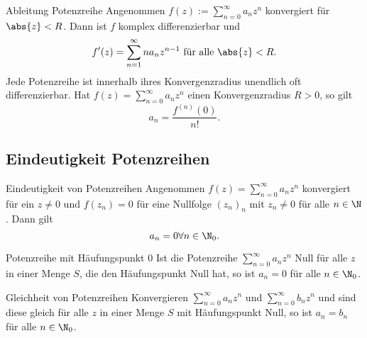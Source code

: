 \begin{karte}{Ableitung Potenzreihe}
    Angenommen \(f(z) := \sum_{n=0}^\infty a_n z^n\) konvergiert für \(\abs{z} < R\). 
    Dann ist \(f\) komplex differenzierbar und 
    \[ f'(z) = \sum_{n=1}^\infty n a_n z^{n-1} \text{ für alle } \abs{z} < R. \]
    Jede Potenzreihe ist innerhalb ihres Konvergenzradius unendlich oft differenzierbar. 
    Hat \( f(z) = \sum_{n=0}^\infty a_n z^n \) einen Konvergenzradius \(R > 0\), so gilt 
    \[ a_n = \frac{f^{(n)}(0)}{n!}. \]
\end{karte}

\subsection{Eindeutigkeit Potenzreihen}

\begin{karte}{Eindeutigkeit von Potenzreihen}
    Angenommen \(f(z) = \sum_{n=0}^\infty a_n z^n\) konvergiert für ein 
    \(z \neq 0\) und \(f(z_n) = 0\) für eine Nullfolge \((z_n)_n\) mit \(z_n \neq 0\) 
    für alle \(n\in\N\). Dann gilt 
    \[ a_n = 0 \forall n\in\N_0. \]
\end{karte}

\begin{karte}{Potenzreihe mit Häufungspunkt \(0\)}
    Ist die Potenzreihe \(\sum_{n=0}^\infty a_n z^n\) Null für alle \(z\) in einer Menge \(S\), 
    die den Häufungspunkt Null hat, so ist \(a_n = 0\) für alle \(n\in\N_0\).
\end{karte}

\begin{karte}{Gleichheit von Potenzreihen}
    Konvergieren \(\sum_{n=0}^\infty a_n z^n\) und \(\sum_{n=0}^\infty b_n z^n\) und sind diese gleich für alle \(z\) in 
    einer Menge \(S\) mit Häufungspunkt Null, so ist \(a_n = b_n\) für alle \(n\in\N_0\).
\end{karte}